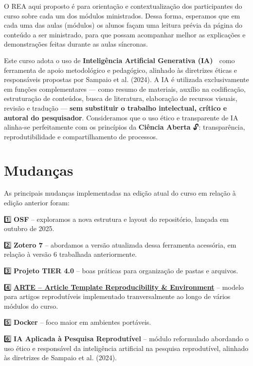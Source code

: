 \documentclass[
  a4paper,
]{book}
\newcommand{\emojitext}[1]{{\emoji #1}}
\begin{document}
O REA aqui proposto é para orientação e contextualização dos
participantes do curso sobre cada um dos módulos ministrados. Dessa
forma, esperamos que em cada uma das aulas (módulos) os alunos façam uma
leitura prévia da página do conteúdo a ser ministrado, para que possam
acompanhar melhor as explicações e demonstrações feitas durante as aulas
síncronas.

Este curso adota o uso de \textbf{Inteligência Artificial Generativa
(IA)} \emojitext{🤖} como ferramenta de apoio metodológico e pedagógico,
alinhado às diretrizes éticas e responsáveis propostas por Sampaio et
al. (2024). A IA é utilizada exclusivamente em funções complementares
--- como resumo de materiais, auxílio na codificação, estruturação de
conteúdos, busca de literatura, elaboração de recursos visuais, revisão
e tradução --- \textbf{sem substituir o trabalho intelectual, crítico e
autoral do pesquisador}. Consideramos que o uso ético e transparente de
IA alinha-se perfeitamente com os princípios da \textbf{Ciência Aberta}
\emojitext{🔓}: transparência, reprodutibilidade e compartilhamento de
processos.

\section*{Mudanças}\label{sec-change}


As principais mudanças implementadas na edição atual do curso em relação
à edição anterior foram:

1️⃣ \textbf{OSF} -- exploramos a nova estrutura e layout do repositório,
lançada em outubro de 2025.

2️⃣ \textbf{Zotero 7} -- abordamos a versão atualizada dessa ferramenta
acessória, em relação à versão 6 trabalhada anteriormente.

3️⃣ \textbf{Projeto TIER 4.0} -- boas práticas para organização de pastas
e arquivos.

4️⃣ \href{https://phdpablo.github.io/article-template/}{\textbf{ARTE --
Article Template Reproducibility \& Environment}} -- modelo para artigos
reprodutíveis implementado tranversalmente ao longo de vários módulos do
curso.

5️⃣ \textbf{Docker} -- foco maior em ambientes portáveis.

6️⃣ \textbf{IA Aplicada à Pesquisa Reprodutível} -- módulo reformulado
abordando o uso ético e responsável da inteligência artificial na
pesquisa reprodutível, alinhado às diretrizes de Sampaio et al. (2024).
\end{document}

